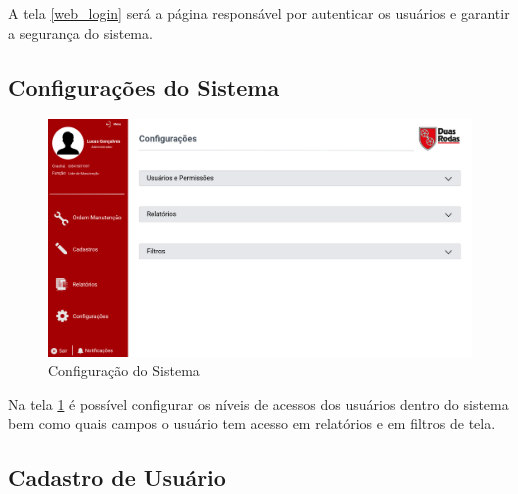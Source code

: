 A tela \ref{web_login} será a página responsável por autenticar os usuários e garantir a segurança do sistema.

\newpage
\subsection{Configurações do Sistema}

\begin{figure}[htb]
	\caption{\label{web_configuracao}Configuração do Sistema}
	\begin{center}
		\includegraphics[scale=0.40]{./Figuras/web/configuracoes.png}
	\end{center}
\end{figure}

Na tela \ref{web_configuracao} é possível configurar os níveis de acessos dos usuários dentro do sistema bem como quais campos o usuário tem acesso em relatórios e em filtros de tela.

\newpage
\subsection{Cadastro de Usuário}

